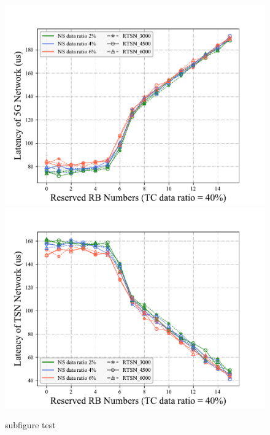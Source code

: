 \documentclass{SCIS2021}
\begin{document}
\begin{figure}[t]
{\begin{minipage}[b]{0.33\textwidth}
				\includegraphics[width=1\textwidth]{t_5G_NS.pdf} \\
				\includegraphics[width=1\textwidth]{t_TSN_NS.pdf}
			\end{minipage}
		\hspace{-0.02\textwidth}
		}
		
		\caption{subfigure test}
	\end{figure}
\end{document}
